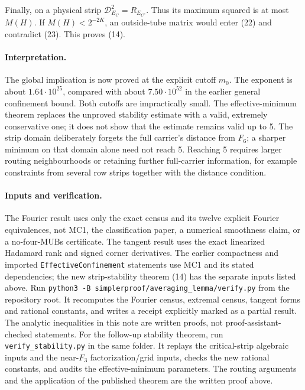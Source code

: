 \documentclass[11pt]{article}
\begin{document}
Finally, on a physical strip $\mathcal D_{E_C}^2=R_{E_{C^c}}$.
Thus its maximum squared is at most $M(H)$.
If $M(H)<2^{-2K}$, an outside-tube matrix would enter (22) and
contradict (23). This proves (14).

\paragraph{Interpretation.}
The global implication is now proved at the explicit cutoff $m_0$.
The exponent is about $1.64\cdot10^{25}$, compared with about
$7.50\cdot10^{52}$ in the earlier general confinement bound. Both
cutoffs are impractically small. The effective-minimum theorem replaces
the unproved stability estimate with a valid, extremely conservative
one; it does not show that the estimate remains valid up to 5.
The strip domain deliberately forgets the full carrier's distance from
$F_6$; a sharper minimum on that domain alone need not reach 5.
Reaching 5 requires larger routing neighbourhoods or retaining further
full-carrier information, for example constraints from several row strips
together with the distance condition.

\paragraph{Inputs and verification.}
The Fourier result uses only the exact census and its twelve explicit
Fourier equivalences, not MC1, the classification paper, a numerical
smoothness claim, or a no-four-MUBs certificate.
The tangent result uses the exact linearized Hadamard rank and signed
corner derivatives. The earlier compactness and imported
\texttt{EffectiveConfinement} statements use MC1 and its stated dependencies;
the new strip-stability theorem (14) has the separate inputs listed above.
Run \texttt{python3 -B simplerproof/averaging\_lemma/verify.py} from
the repository root. It recomputes the Fourier census, extremal census,
tangent forms and rational constants, and writes a receipt explicitly
marked as a partial result. The analytic inequalities in this note are
written proofs, not proof-assistant-checked statements.
For the follow-up stability theorem, run \texttt{verify\_stability.py}
in the same folder. It replays the critical-strip algebraic inputs and
the near-$F_3$ factorization/grid inputs, checks the new rational constants,
and audits the effective-minimum parameters. The routing arguments and
the application of the published theorem are the written proof above.
\end{document}
